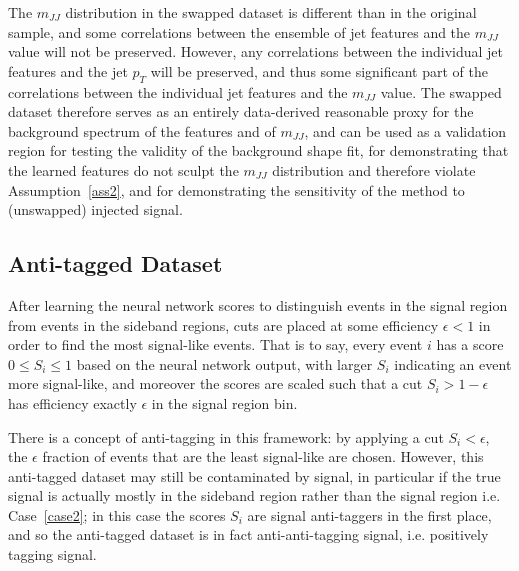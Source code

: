 The $m_{JJ}$ distribution in the swapped dataset is different than in the original sample, and some correlations between the ensemble of jet features and the $m_{JJ}$ value will not be preserved.
However, any correlations between the individual jet features and the jet $p_T$ will be preserved, and thus some significant part of the correlations between the individual jet features and the $m_{JJ}$ value.
The swapped dataset therefore serves as an entirely data-derived reasonable proxy for the background spectrum of the features and of $m_{JJ}$, and can be used as a validation region for testing the validity of the background shape fit, for demonstrating that the learned features do not sculpt the $m_{JJ}$ distribution and therefore violate Assumption~\ref{ass2}, and for demonstrating the sensitivity of the method to (unswapped) injected signal.

\subsection{Anti-tagged Dataset}
After learning the neural network scores to distinguish events in the signal region from events in the sideband regions, cuts are placed at some efficiency $\epsilon < 1$ in order to find the most signal-like events.
That is to say, every event $i$ has a score $0\le S_i \le 1$ based on the neural network output, with larger $S_i$ indicating an event more signal-like, and moreover the scores are scaled such that a cut $S_i>1-\epsilon$ has efficiency exactly $\epsilon$ in the signal region bin.

There is a concept of anti-tagging in this framework: by applying a cut $S_i<\epsilon$, the $\epsilon$ fraction of events that are the least signal-like are chosen.
However, this anti-tagged dataset may still be contaminated by signal, in particular if the true signal is actually mostly in the sideband region rather than the signal region i.e. Case~\ref{case2}; in this case the scores $S_i$ are signal anti-taggers in the first place, and so the anti-tagged dataset is in fact anti-anti-tagging signal, i.e. positively tagging signal.

